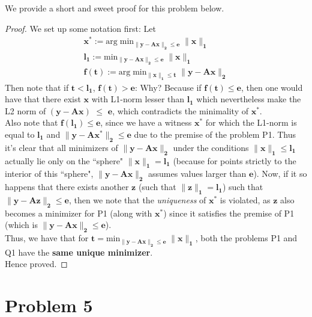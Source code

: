 \documentclass[a4paper,11pt]{article}
\numberwithin{definition}{section}
\numberwithin{mytheorem}{subsection}
\begin{document}
We provide a short and sweet proof for this problem below.
\begin{proof}
We set up some notation first: Let 
\begin{gather*}
    \boldsymbol{x^*} :=  \mathrm{arg\;min}\boldsymbol{_{\lVert y - Ax\rVert_2 \leq e}\;\lVert x\rVert_1} \\
    \boldsymbol{l_1 := } \mathrm{min}\boldsymbol{_{\lVert y - Ax\rVert_2 \leq e}\;\lVert x\rVert_1} \\
    \boldsymbol{f(t) := } \mathrm{arg\;min}\boldsymbol{_{\lVert x\rVert_1 \leq t}\; \lVert y - Ax\rVert_2} 
\end{gather*}
Then note that if $\boldsymbol{t < l_1}$, $\boldsymbol{f(t) > e}$: Why? Because if $\boldsymbol{f(t) \leq e}$, then one would have that there exist $\boldsymbol{x}$ with L1-norm lesser than $\boldsymbol{l_1}$ which nevertheless make the L2 norm of $\boldsymbol{(y - Ax)}$ $\leq$ $\boldsymbol{e}$, which contradicts the minimality of $\boldsymbol{x^*}$.\\
Also note that $\boldsymbol{f(l_1) \leq e}$, since we have a witness $\boldsymbol{x^*}$ for which the L1-norm is equal to $\boldsymbol{l_1}$ and $\boldsymbol{\lVert y - Ax^*\rVert_2 \leq e}$ due to the premise of the problem P1. Thus it's clear that all minimizers of $\boldsymbol{\lVert y - Ax\rVert_2}$ under the conditions $\boldsymbol{\lVert x\rVert_1 \leq l_1}$ actually lie only on the ``sphere" $\boldsymbol{\lVert x\rVert_1 = l_1}$ (because for points strictly to the interior of this ``sphere", $\boldsymbol{\lVert y - Ax\rVert_2}$ assumes values larger than $\boldsymbol{e}$). Now, if it so happens that there exists another $\boldsymbol{z}$ (such that $\boldsymbol{\lVert z\rVert_1 = l_1}$) such that $\boldsymbol{\lVert y - Az\rVert_2 \leq e}$, then we note that the \emph{uniqueness} of $\boldsymbol{x^*}$ is violated, as $\boldsymbol{z}$ also becomes a minimizer for P1 (along with $\boldsymbol{x^*}$) since it satisfies the premise of P1 (which is $\boldsymbol{\lVert y - Ax\rVert_2 \leq e}$).\\
Thus, we have that for $\boldsymbol{t = \mathrm{min}_{\lVert y - Ax\rVert_2 \leq e}\;\lVert x\rVert_1}$, both the problems P1 and Q1 have the \textbf{same unique minimizer}.\\
Hence proved.
\end{proof}

\newpage
\section{Problem 5}
\end{document}
